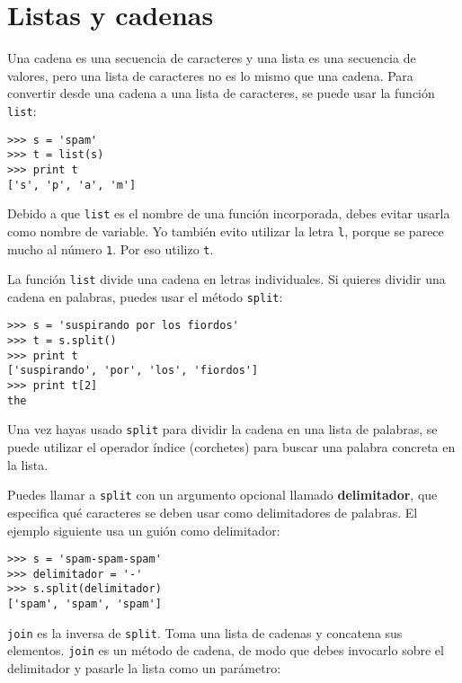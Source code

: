 \section{Listas y cadenas}


Una cadena es una secuencia de caracteres y una lista es una secuencia
de valores, pero una lista de caracteres no es lo mismo que una
cadena. Para convertir desde una cadena a una lista de caracteres,
se puede usar la función {\tt list}:


\beforeverb
\begin{verbatim}
>>> s = 'spam'
>>> t = list(s)
>>> print t
['s', 'p', 'a', 'm']
\end{verbatim}
\afterverb
%
Debido a que {\tt list} es el nombre de una función incorporada, debes
evitar usarla como nombre de variable. Yo también evito utilizar la letra {\tt l},
porque se parece mucho al número {\tt 1}. Por eso utilizo {\tt t}.

La función {\tt list} divide una cadena en letras individuales. Si
quieres dividir una cadena en palabras, puedes usar el método
{\tt split}:


\beforeverb
\begin{verbatim}
>>> s = 'suspirando por los fiordos'
>>> t = s.split()
>>> print t
['suspirando', 'por', 'los', 'fiordos']
>>> print t[2]
the
\end{verbatim}
\afterverb
%
Una vez hayas usado {\tt split} para dividir la cadena
en una lista de palabras, se puede utilizar el operador índice
(corchetes) para buscar una palabra concreta en la lista.

Puedes llamar a {\tt split} con
un argumento opcional llamado {\bf delimitador}, que
especifica qué caracteres se deben usar como delimitadores de palabras.
El ejemplo siguiente usa un guión como delimitador:


\beforeverb
\begin{verbatim}
>>> s = 'spam-spam-spam'
>>> delimitador = '-'
>>> s.split(delimitador)
['spam', 'spam', 'spam']
\end{verbatim}
\afterverb
%
{\tt join} es la inversa de {\tt split}. Toma
una lista de cadenas y
concatena sus elementos. {\tt join} es un método de cadena,
de modo que debes invocarlo sobre el delimitador y pasarle
la lista como un parámetro:

